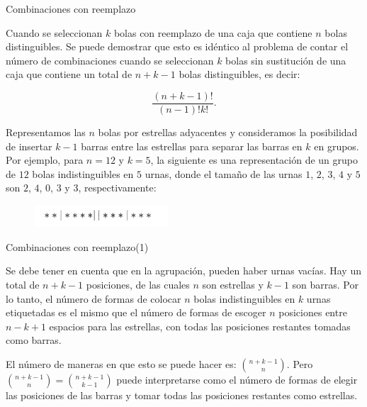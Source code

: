\documentclass[10pt]{beamer}
\begin{document}
\begin{frame}{Combinaciones con reemplazo }
	
\small{Cuando se seleccionan $k$ bolas con reemplazo de una caja que contiene $n$ bolas distinguibles. Se puede demostrar que esto es id\'entico al problema de contar el n\'umero de combinaciones cuando se seleccionan $k$ bolas sin sustituci\'on de una caja que contiene un total de $n + k- 1$ bolas distinguibles, es decir:
	
	\[
	\frac{(n + k -1)!}{(n -1)!k!}.
	\]

\vspace{0.2cm}

Representamos las $n$ bolas por estrellas adyacentes y consideramos la posibilidad de insertar $k -1$ barras entre las estrellas para separar las barras en $k$ en grupos. Por ejemplo, para $n =12$ y $k =5$, la siguiente es una representaci\'on de un grupo  de $12$ bolas indistinguibles en $5$ urnas, donde el tama\~no de las urnas $1$, $2$, $3$, $4$ y $5$ son $2$, $4$, $0$, $3$ y $3$, respectivamente:

\vspace{0.2cm}

\begin{figure}[h]
	\centering
	\includegraphics[width=5cm]{c2}
\end{figure}
	}
\end{frame}

\begin{frame}{Combinaciones con reemplazo(1)}
	
Se debe tener  en cuenta que en la agrupaci\'on,  pueden haber urnas vac\'ias. Hay un total de $n + k -1$ posiciones, de las cuales $n$ son estrellas y $k -1$ son barras. Por lo tanto, el n\'umero de formas de colocar $n$ bolas indistinguibles en $k$ urnas etiquetadas es el mismo que el n\'umero de formas de escoger $n$ posiciones entre $n -k + 1$ espacios para las estrellas, con todas las posiciones restantes tomadas como barras.

\vspace{0.5cm}

El n\'umero de maneras en que esto se puede hacer es: $\binom{n + k -1}{n}$. Pero	 $\binom{n + k -1}{n} =  \binom{n + k -1}{k -1}$ puede interpretarse como el n\'umero de formas de elegir las posiciones de las barras y tomar todas las posiciones restantes como estrellas.
\end{frame}
\end{document}
